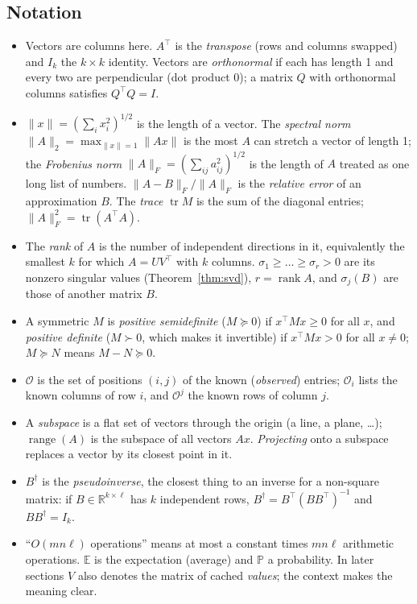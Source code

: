 \documentclass[10pt]{article}
\theoremstyle{plain}
\theoremstyle{definition}
\theoremstyle{remark}
\newcommand{\R}{\mathbb{R}}
\newcommand{\E}{\mathbb{E}}
\newcommand{\Prob}{\mathbb{P}}
\newcommand{\T}{^{\top}}
\newcommand{\opn}[1]{\lVert #1\rVert_2}
\newcommand{\fro}[1]{\lVert #1\rVert_F}
\newcommand{\norm}[1]{\lVert #1\rVert}
\newcommand{\obs}{\mathcal{O}}
\DeclareMathOperator{\tr}{tr}
\DeclareMathOperator{\rank}{rank}
\DeclareMathOperator{\range}{range}
\begin{document}
\subsection{Notation}
\label{sec:notation}
\begin{itemize}[leftmargin=2em,itemsep=0pt]
\item Vectors are columns here. $A\T$ is the \emph{transpose} (rows and columns swapped) and $I_k$ the $k\times k$ identity. Vectors are \emph{orthonormal} if each has length 1 and every two are perpendicular (dot product 0); a matrix $Q$ with orthonormal columns satisfies $Q\T Q=I$.
\item $\norm x=(\sum_ix_i^2)^{1/2}$ is the length of a vector. The \emph{spectral norm} $\opn A=\max_{\norm x=1}\norm{Ax}$ is the most $A$ can stretch a vector of length 1; the \emph{Frobenius norm} $\fro A=(\sum_{ij}a_{ij}^2)^{1/2}$ is the length of $A$ treated as one long list of numbers. $\fro{A-B}/\fro A$ is the \emph{relative error} of an approximation $B$. The \emph{trace} $\tr M$ is the sum of the diagonal entries; $\fro A^2=\tr(A\T A)$.
\item The \emph{rank} of $A$ is the number of independent directions in it, equivalently the smallest $k$ for which $A=UV\T$ with $k$ columns. $\sigma_1\ge\dots\ge\sigma_r>0$ are its nonzero singular values (Theorem~\ref{thm:svd}), $r=\rank A$, and $\sigma_j(B)$ are those of another matrix $B$.
\item A symmetric $M$ is \emph{positive semidefinite} ($M\succeq0$) if $x\T Mx\ge0$ for all $x$, and \emph{positive definite} ($M\succ0$, which makes it invertible) if $x\T Mx>0$ for all $x\ne0$; $M\succeq N$ means $M-N\succeq0$.
\item $\obs$ is the set of positions $(i,j)$ of the known (\emph{observed}) entries; $\obs_i$ lists the known columns of row $i$, and $\obs^j$ the known rows of column $j$.
\item A \emph{subspace} is a flat set of vectors through the origin (a line, a plane, \dots); $\range(A)$ is the subspace of all vectors $Ax$. \emph{Projecting} onto a subspace replaces a vector by its closest point in it.
\item $B^\dagger$ is the \emph{pseudoinverse}, the closest thing to an inverse for a non-square matrix: if $B\in\R^{k\times\ell}$ has $k$ independent rows, $B^\dagger=B\T(BB\T)^{-1}$ and $BB^\dagger=I_k$.
\item ``$O(mn\ell)$ operations'' means at most a constant times $mn\ell$ arithmetic operations. $\E$ is the expectation (average) and $\Prob$ a probability. In later sections $V$ also denotes the matrix of cached \emph{values}; the context makes the meaning clear.
\end{itemize}
\end{document}
